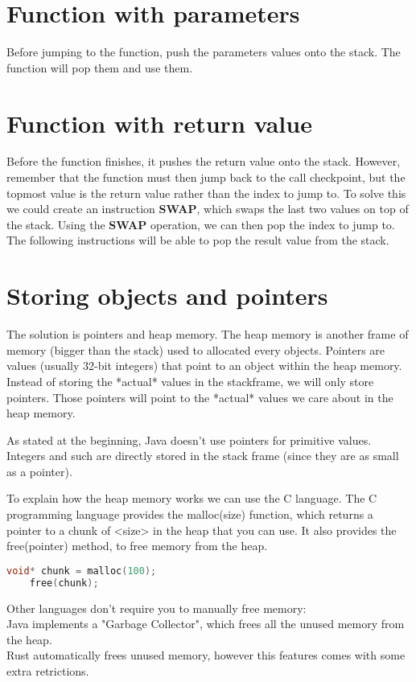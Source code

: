 \documentclass{article}
\begin{document}
\section{Function with parameters}

Before jumping to the function, push the parameters values onto the stack.
The function will pop them and use them.

\section{Function with return value}

Before the function finishes, it pushes the return value onto the stack.
However, remember that the function must then jump back to the call checkpoint,
but the topmost value is the return value rather than the index to jump to.
To solve this we could create an instruction \textbf{SWAP}, which swaps the last two values on top of the stack.
Using the \textbf{SWAP} operation, we can then pop the index to jump to. The following instructions will be able to pop
the result value from the stack.

\section{Storing objects and pointers}

The solution is pointers and heap memory.
The heap memory is another frame of memory (bigger than the stack) used to allocated every objects.
Pointers are values (usually 32-bit integers) that point to an object within the heap memory.
Instead of storing the *actual* values in the stackframe, we will only store pointers.
Those pointers will point to the *actual* values we care about in the heap memory.

As stated at the beginning, Java doesn't use pointers for primitive values. Integers and such
are directly stored in the stack frame (since they are as small as a pointer).

To explain how the heap memory works we can use the C language.
The C programming language provides the malloc(size) function, which returns a pointer to a chunk of <size> in the heap that you can use.
It also provides the free(pointer) method, to free memory from the heap.

\begin{lstlisting}[language=C]
    void* chunk = malloc(100);
    free(chunk);
\end{lstlisting}

Other languages don't require you to manually free memory: \\
Java implements a "Garbage Collector", which frees all the unused memory from the heap. \\
Rust automatically frees unused memory, however this features comes with some extra retrictions.
\end{document}
